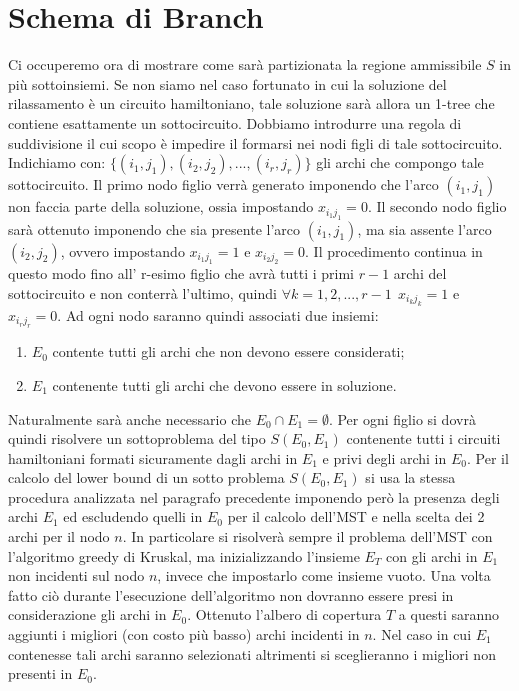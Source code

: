 \documentclass[
	article,			%
	12pt,				%
	oneside,			%
	a4paper,			%
	english,			%
	italian,				%
	sumario=tradicional,
	]{abntex2}
\begin{document}
\section{Schema di Branch}
Ci occuperemo ora di mostrare come sarà partizionata la regione ammissibile $S$ in più sottoinsiemi. Se non siamo nel caso fortunato in cui la soluzione del rilassamento è un circuito hamiltoniano, tale soluzione sarà allora un 1-tree che contiene esattamente un sottocircuito. Dobbiamo introdurre una regola di suddivisione il cui scopo è impedire il formarsi nei nodi figli di tale sottocircuito. Indichiamo con: $\{(i_1, j_1), (i_2,j_2),...,(i_r,j_r)\}$ gli archi che compongo tale sottocircuito. Il primo nodo figlio verrà generato imponendo che l'arco $(i_1,j_1)$ non faccia parte della soluzione, ossia impostando $x_{i_{1}j_{1}} = 0$. Il secondo nodo figlio sarà ottenuto imponendo che sia presente l'arco $(i_1,j_1)$, ma sia assente l'arco $(i_2,j_2)$, ovvero impostando $x_{i_{1}j_{1}} = 1$ e $x_{i_{2}j_{2}} = 0$. Il procedimento continua in questo modo fino all' r-esimo figlio che avrà tutti i primi $r-1$ archi del sottocircuito e non conterrà l'ultimo, quindi $\forall k = 1,2,...,r-1 \:\:x_{i_{k}j_{k}} = 1$ e $x_{i_{r}j_{r}} = 0$.
\newpage
Ad ogni nodo saranno quindi associati due insiemi: 
\begin{enumerate}
    \item $E_0$ contente tutti gli archi che non devono essere considerati;
    \item $E_1$ contenente tutti gli archi che devono essere in soluzione.
\end{enumerate}
Naturalmente sarà anche necessario che $E_0 \cap E_1 = \emptyset$.
\newline
Per ogni figlio si dovrà quindi risolvere un sottoproblema del tipo $S(E_0, E_1)$ contenente tutti i circuiti hamiltoniani formati sicuramente dagli archi in $E_1$ e privi degli archi in $E_0$.
Per il calcolo del lower bound di un sotto problema $S(E_0, E_1)$ si usa la stessa procedura analizzata nel paragrafo precedente imponendo però la presenza degli archi $E_1$ ed escludendo quelli in $E_0$ per il calcolo dell'MST e nella scelta dei 2 archi per il nodo $n$.
In particolare si risolverà sempre il problema dell'MST con l'algoritmo greedy di Kruskal, ma inizializzando l'insieme $E_T$ con gli archi in $E_1$ non incidenti sul nodo $n$, invece che impostarlo come insieme vuoto. Una volta fatto ciò durante l'esecuzione dell'algoritmo non dovranno essere presi in considerazione gli archi in $E_0$. Ottenuto l'albero di copertura $T$ a questi saranno aggiunti i migliori (con costo più basso) archi incidenti in $n$. Nel caso in cui $E_1$ contenesse tali archi saranno selezionati altrimenti si sceglieranno i migliori non presenti in $E_0$. 
\end{document}
